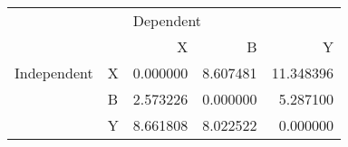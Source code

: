 \begin{tabular}{llrrr}
\toprule
            &   & \multicolumn{3}{l}{Dependent} \\
            &   &         X &         B &          Y \\
\midrule
Independent & X &  0.000000 &  8.607481 &  11.348396 \\
            & B &  2.573226 &  0.000000 &   5.287100 \\
            & Y &  8.661808 &  8.022522 &   0.000000 \\
\bottomrule
\end{tabular}
